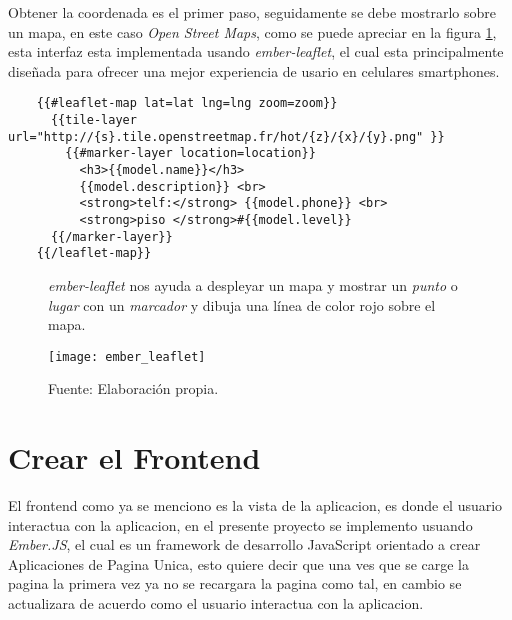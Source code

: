   Obtener la coordenada es el primer paso, seguidamente se debe mostrarlo sobre un mapa, en este caso \emph{Open Street Maps}, como se puede apreciar en la figura \ref{fig:ember_leaflet}, esta interfaz esta implementada usando \emph{ember-leaflet}, el cual esta principalmente dise\~nada para ofrecer una mejor experiencia de usario en celulares smartphones.\\


  \begin{verbatim}
    {{#leaflet-map lat=lat lng=lng zoom=zoom}}
      {{tile-layer url="http://{s}.tile.openstreetmap.fr/hot/{z}/{x}/{y}.png" }}
        {{#marker-layer location=location}}
          <h3>{{model.name}}</h3>
          {{model.description}} <br>
          <strong>telf:</strong> {{model.phone}} <br>
          <strong>piso </strong>#{{model.level}}
      {{/marker-layer}}
    {{/leaflet-map}}
  \end{verbatim}

  \begin{figure}[H]
        \begin{center}
          \caption{\emph{ember-leaflet} nos ayuda a despleyar un mapa y mostrar un \emph{punto} o \emph{lugar} con un \emph{marcador} y dibuja una línea de color rojo sobre el mapa.}
          \label{fig:ember_leaflet}
          \texttt{[image: ember\_leaflet]}
        \end{center}
        \caption*{Fuente: Elaboración propia.}
  \end{figure}


\section{Crear el Frontend}
\label{sec:Crear el Frontend}


El frontend como ya se menciono es la vista de la aplicacion, es donde el usuario interactua con la aplicacion, en el presente proyecto se implemento usuando \emph{Ember.JS}, el cual es un framework de desarrollo JavaScript orientado a crear Aplicaciones de Pagina Unica, esto quiere decir que una ves que se carge la pagina la primera vez ya no se recargara la pagina como tal, en cambio se actualizara de acuerdo como el usuario interactua con la aplicacion.\\

